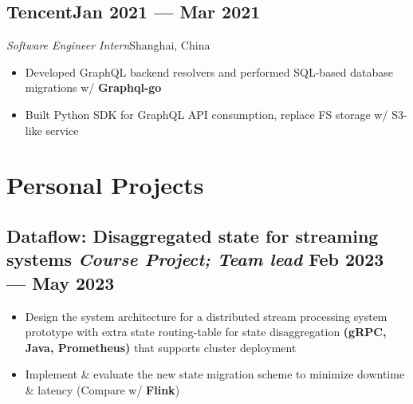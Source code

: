 \documentclass[a4,12pt]{article}
\newcommand{\subtext}[1]{
#1\par\vspace{-0.3cm}}
\newenvironment{zitemize}{
\begin{itemize}\itemsep0pt \parskip0pt \parsep1pt}
{\end{itemize}\vspace{-0.5cm}}
\begin{document}
\vspace{-0.1cm}


\subsection*{\normalsize\textbf{Tencent}\hfill Jan 2021 --- Mar 2021} 
\subtext{\textit{Software Engineer Intern}\hfill Shanghai, China} 
    \begin{zitemize}
        \item Developed GraphQL backend resolvers and performed SQL-based database migrations w/ \textbf{Graphql-go}
        \item Built Python SDK for GraphQL API consumption, replace FS storage w/ S3-like service
    \end{zitemize}






\vspace{-0.2cm}

\section{\textbf{Personal Projects}}

\vspace{-0.1cm}
\subsection*{Dataflow: Disaggregated state for streaming systems \normalfont\textit{Course Project; Team lead} \hfill \textbf{Feb 2023 --- May 2023}} 
\begin{zitemize}
    \item Design the system architecture for a distributed stream processing system prototype with extra state routing-table for state disaggregation \textbf{(gRPC, Java, Prometheus)} that supports cluster deployment
    \item Implement \& evaluate the new state migration scheme to minimize downtime \& latency (Compare w/ \textbf{Flink})
\end{zitemize}
\end{document}
